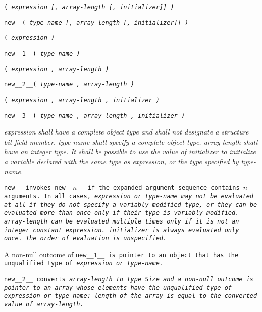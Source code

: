 
\s\s\s\s\tt{(} \it{expression}
[\tt{,} \it{array-length}
[\tt{,} \it{initializer}]] \tt{)}

 \tt{new__}\s\s\s\s\tt{(} \it{type-name}
[\tt{,} \it{array-length}
[\tt{,} \it{initializer}]] \tt{)}

\s\tt{(} \it{expression} \tt{)}

 \tt{new__1__}\s\tt{(} \it{type-name}  \tt{)}

\s\tt{(} \it{expression}
\phantom{[}\tt{,} \it{array-length}\phantom{]} \tt{)}

 \tt{new__2__}\s\tt{(} \it{type-name}
\phantom{[}\tt{,} \it{array-length}\phantom{]} \tt{)}

\s\tt{(} \it{expression}
\phantom{[}\tt{,} \it{array-length}
\phantom{[}\tt{,} \it{initializer}\phantom{]]} \tt{)}

 \tt{new__3__}\s\tt{(} \it{type-name}
\phantom{[}\tt{,} \it{array-length}
\phantom{[}\tt{,} \it{initializer}\phantom{]]} \tt{)}


\it{expression} shall have a complete object type
and shall not designate a structure bit-field member.
\it{type-name}  shall specify a complete object type.
\it{array-length} shall have an integer type.
It shall be possible to use the value of \it{initializer} to
initialize a variable declared with the same type as \it{expression},
or the type specified by \it{type-name}.


\tt{new__} invokes \tt{new__}$n$\_\_ if the
expanded argument sequence contains $n$ arguments.
In all cases, \it{expression} or \it{type-name} may not be evaluated
at all if they do not specify a variably modified type, or they can
be evaluated more than once only if their type is variably modified.
\it{array-length} can be evaluated multiple times
only if it is not an integer constant expression.
\it{initializer} is always evaluated only once.
The order of evaluation is unspecified.

A non-null outcome of \tt{new__1__} is pointer to an object
that has the unqualified type of \it{expression} or \it{type-name}.

\tt{new__2__} converts \it{array-length} to type \tt{Size}
and a non-null outcome is pointer to an array whose elements
have the unqualified type of \it{expression} or \it{type-name};
length of the array is equal to the converted value of \it{array-length}.

